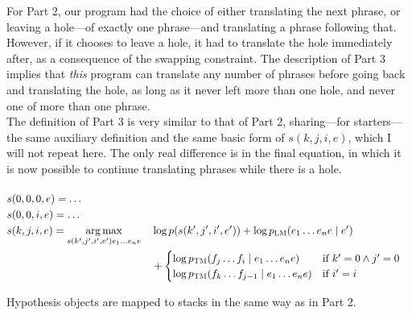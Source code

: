 \documentclass[answers]{exam}
\newcommand{\ptm}[1]{p_{\textsc{TM}}(#1)}
\newcommand{\plm}[1]{p_{\textsc{LM}}(#1)}
\DeclareMathOperator*{\argmax}{arg\,max}
\begin{document}
\begin{questions}
\begin{framed}
  For Part 2, our program had the choice of either translating the next phrase,
  or leaving a hole---of exactly one phrase---and translating a phrase following
  that. However, if it chooses to leave a hole, it had to translate the hole
  immediately after, as a consequence of the swapping constraint. 
  The description of Part 3 implies that \emph{this} program can translate any
  number of phrases before going back and translating the hole, as long as it
  never left more than one hole, and never one of more than one phrase. 
  \\
  The definition of Part 3 is very similar to that of Part 2, sharing---for
  starters---the same auxiliary definition and the same basic form of
  $s(k,j,i,e)$, which I will not repeat here. The only real difference is in the
  final equation, in which it is now possible to continue translating phrases
  while there is a hole.
  \\
  \\
  \(\!
  \begin{aligned}
    &s(0,0,0,e) = \ldots\\
    &s(0,0,i,e) = \ldots\\
    &s(k,j,i,e) =
    \argmax_{s(k',j',i',e')e_{1}\dots e_{n}e}
    &&\log{p(s(k',j',i',e'))} + \log{\plm{e_{1}\dots e_{n}e \mid e'}} 
    \\& &&+
    \begin{cases}
      \log{\ptm{f_{j}\dots f_{i} \mid e_{1}\dots e_{n}e}}
      &\text{if }k' = 0 \land j' = 0
      \\
      \log{\ptm{f_{k}\dots f_{j-1} \mid e_{1}\dots e_{n}e}}
      &\text{if }i' = i
    \end{cases}
  \end{aligned}
  \)
\end{framed}


\begin{framed}
\end{framed}


\begin{framed}
  Hypothesis objects are mapped to stacks in the same way as in Part 2.
\end{framed}



\end{questions}
\end{document}
